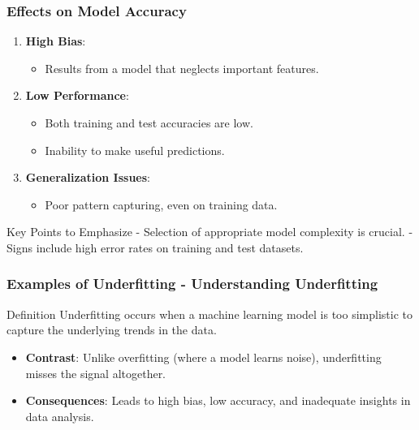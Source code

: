 \documentclass[aspectratio=169]{beamer}
\begin{document}
\begin{frame}[fragile]
    \frametitle{Effects on Model Accuracy}
    \begin{enumerate}
        \item \textbf{High Bias}: 
            \begin{itemize}
                \item Results from a model that neglects important features.
            \end{itemize}
        \item \textbf{Low Performance}:
            \begin{itemize}
                \item Both training and test accuracies are low.
                \item Inability to make useful predictions.
            \end{itemize}
        \item \textbf{Generalization Issues}:
            \begin{itemize}
                \item Poor pattern capturing, even on training data.
            \end{itemize}
    \end{enumerate}
    
    \begin{block}{Key Points to Emphasize}
        - Selection of appropriate model complexity is crucial.
        - Signs include high error rates on training and test datasets.
    \end{block}
\end{frame}

\begin{frame}[fragile]
    \frametitle{Examples of Underfitting - Understanding Underfitting}
    \begin{block}{Definition}
        Underfitting occurs when a machine learning model is too simplistic to capture the underlying trends in the data. 
    \end{block}
    \begin{itemize}
        \item \textbf{Contrast}: Unlike overfitting (where a model learns noise), underfitting misses the signal altogether.
        \item \textbf{Consequences}: Leads to high bias, low accuracy, and inadequate insights in data analysis.
    \end{itemize}
\end{frame}
\end{document}
